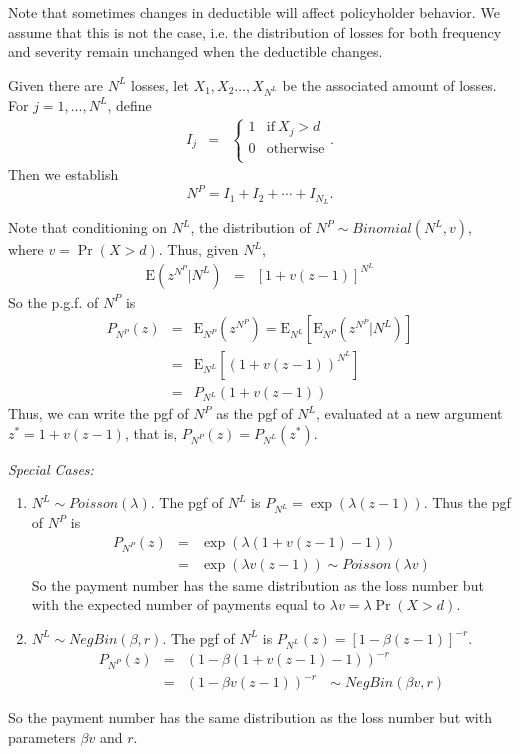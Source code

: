 \documentclass[12pt,letterpaper]{article}
\begin{document}
Note that sometimes changes in deductible will affect policyholder behavior. We assume that this is not the case, i.e. the distribution of losses for both frequency and severity remain unchanged when the deductible changes.

Given there are $N^L$ losses, let $X_1,X_2\ldots,X_{N^L}$ be the associated amount of losses. For $j=1,\ldots,N^L$, define
\begin{eqnarray*}
I_j&=&
\left \{
\begin{array}{cc}
1 & \text{if} ~X_j>d\\
0 & \text{otherwise}\\
\end{array}
\right..
\end{eqnarray*}
Then we establish
$$N^P=I_1+I_2+\cdots+I_{N_L}.$$


Note that conditioning on $N^L$, the distribution of $N^P \sim Binomial (N^L, v)$, where $v=\Pr(X>d)$. Thus, given $N^L$,
\begin{eqnarray*}
\mathrm{E}\left(z^{N^P}|N^L\right)&=&\left[ 1+v(z-1)\right]^{N^L}
\end{eqnarray*}
So the p.g.f. of $N^P$ is
\begin{eqnarray*}
P_{N^P}(z)&=&\mathrm{E}_{N^P}\left(z^{N^P}\right)=\mathrm{E}_{N^L}\left[\mathrm{E}_{N^P}\left(z^{N^P}|N^L\right)\right]\\
&=&\mathrm{E}_{N^L}\left[(1+v(z-1))^{N^L}\right]\\
&=&P_{N^L}\left(1+v(z-1)\right)
\end{eqnarray*}
Thus, we can write the pgf of $N^P$ as the pgf of $N^L$, evaluated at a new argument $z^* =  1+v(z-1)$, that is, $P_{N^P}(z)=P_{N^L}(z^*)$.




\bigskip
\textit{Special Cases:}
\begin{enumerate}
\item $N^L\sim Poisson (\lambda)$. The pgf of $N^L$ is $P_{N^L}=\exp(\lambda(z-1))$. Thus the pgf of $N^P$ is
\begin{eqnarray*}
P_{N^P}(z)&=&\exp\left( \lambda(1+v(z-1)-1)\right)\\
&=&\exp(\lambda v(z-1))\sim Poisson (\lambda v)
\end{eqnarray*}
So the payment number has the same distribution as the loss number but with the expected number of payments equal to $\lambda v = \lambda \Pr(X>d)$.


\item $N^L \sim NegBin(\beta, r)$. The pgf of $N^L$ is $P_{N^{L}}\left( z\right) =\left[ 1-\beta \left( z-1\right)\right]^{-r}$.
\begin{eqnarray*}
P_{N^P}(z)&=&\left( 1-\beta (1+v(z-1)-1)\right)^{-r}\\
&=&\left( 1-\beta v(z-1)\right)^{-r} \:\:\:\sim NegBin(\beta v, r)
\end{eqnarray*}
\end{enumerate}
So the payment number has the same distribution as the loss number but with parameters $\beta v$ and $r$.
\end{document}
